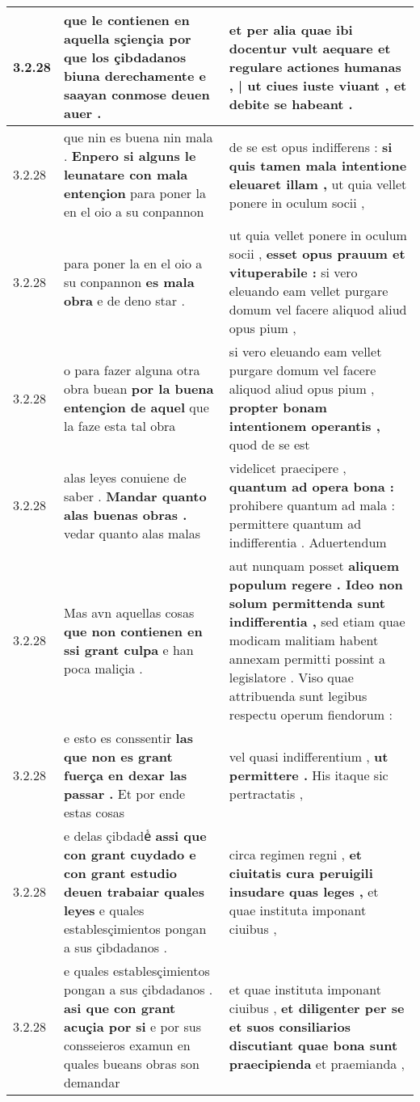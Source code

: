 \begin{tabular}{|p{1cm}|p{6.5cm}|p{6.5cm}|}
3.2.28 & que le contienen en aquella sçiençia \textbf{ por que los çibdadanos biuna derechamente } e saayan conmose deuen auer . & et per alia quae ibi docentur vult aequare \textbf{ et regulare actiones humanas , | ut ciues iuste viuant , } et debite se habeant . \\\hline
3.2.28 & que nin es buena nin mala . \textbf{ Enpero si alguns le leunatare con mala entençion } para poner la en el oio a su conpannon & de se est opus indifferens : \textbf{ si quis tamen mala intentione eleuaret illam , } ut quia vellet ponere in oculum socii , \\\hline
3.2.28 & para poner la en el oio a su conpannon \textbf{ es mala obra } e de deno star . & ut quia vellet ponere in oculum socii , \textbf{ esset opus prauum et vituperabile : } si vero eleuando eam vellet purgare domum vel facere aliquod aliud opus pium , \\\hline
3.2.28 & o para fazer alguna otra obra buean \textbf{ por la buena entençion de aquel } que la faze esta tal obra & si vero eleuando eam vellet purgare domum vel facere aliquod aliud opus pium , \textbf{ propter bonam intentionem operantis , } quod de se est \\\hline
3.2.28 & alas leyes conuiene de saber . \textbf{ Mandar quanto alas buenas obras . } vedar quanto alas malas & videlicet praecipere , \textbf{ quantum ad opera bona : } prohibere quantum ad mala : permittere quantum ad indifferentia . Aduertendum \\\hline
3.2.28 & Mas avn aquellas cosas \textbf{ que non contienen en ssi grant culpa } e han poca maliçia . & aut nunquam posset \textbf{ aliquem populum regere . Ideo non solum permittenda sunt indifferentia , } sed etiam quae modicam malitiam habent annexam permitti possint a legislatore . Viso quae attribuenda sunt legibus respectu operum fiendorum : \\\hline
3.2.28 & e esto es conssentir \textbf{ las que non es grant fuerça en dexar las passar . } Et por ende estas cosas & vel quasi indifferentium , \textbf{ ut permittere . } His itaque sic pertractatis , \\\hline
3.2.28 & e delas çibdadeᷤ \textbf{ assi que con grant cuydado e con grant estudio deuen trabaiar quales leyes } e quales establesçimientos pongan a sus çibdadanos . & circa regimen regni , \textbf{ et ciuitatis cura peruigili insudare quas leges , } et quae instituta imponant ciuibus , \\\hline
3.2.28 & e quales establesçimientos pongan a sus çibdadanos . \textbf{ asi que con grant acuçia por si } e por sus consseieros examun en quales bueans obras son demandar & et quae instituta imponant ciuibus , \textbf{ et diligenter per se et suos consiliarios discutiant quae bona sunt praecipienda } et praemianda , \\\hline

\end{tabular}
